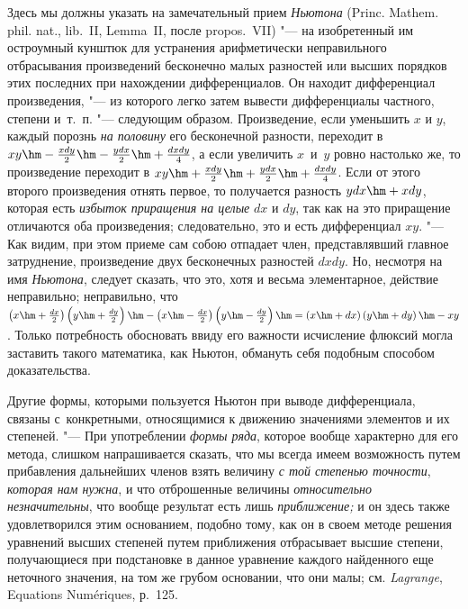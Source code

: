 Здесь мы должны указать на замечательный прием {\em Ньютона} (Princ. Mathem.
phil. nat., lib.~II, Lemma~II, после propos.~VII) "--- на изобретенный им
остроумный кунштюк для устранения арифметически неправильного отбрасывания
произведений бесконечно малых разностей или высших порядков этих последних при
нахождении дифференциалов. Он находит дифференциал произведения, "--- из
которого легко затем вывести дифференциалы частного, степени и~т.~п. "---
следующим образом. Произведение, если уменьшить $x$ и $y$, каждый порознь
{\em на половину} его бесконечной разности, переходит в
$xy\hm-\frac{xdy}2\hm-\frac{ydx}2\hm+\frac{dxdy}4$, а если увеличить
$x$~и~$y$ ровно настолько же, то произведение переходит в
$xy\hm+\frac{xdy}2\hm+\frac{ydx}2\hm+\frac{dxdy}4$. Если от этого второго
произведения отнять первое, то получается разность $ydx\hm+xdy$, которая есть
{\em избыток приращения на целые} $dx$ и $dy$, так как на это приращение
отличаются оба произведения; следовательно, это и есть дифференциал $xy$. "---
Как видим, при этом приеме сам собою отпадает член, представлявший главное
затруднение, произведение двух бесконечных разностей $dxdy$. Но, несмотря на
имя {\em Ньютона}, следует сказать, что это, хотя и весьма элементарное,
действие неправильно; неправильно, что
$\left(x\hm+\frac{dx}2\right)\left(y\hm+\frac{dy}2\right)\hm-
\left(x\hm-\frac{dx}2\right)\left(y\hm-\frac{dy}2\right)\hm=
\left(x\hm+dx\right)\left(y\hm+dy\right)\hm-xy$. Только потребность обосновать
ввиду его важности исчисление флюксий могла заставить такого математика, как
Ньютон, обмануть себя подобным способом доказательства.

Другие формы, которыми пользуется Ньютон при выводе дифференциала, связаны
с~конкретными, относящимися к движению значениями элементов и их степеней. "---
При употреблении {\em формы ряда}, которое вообще характерно для его метода,
слишком напрашивается сказать, что мы всегда имеем возможность путем
прибавления дальнейших членов взять величину {\em с той степенью точности},
{\em которая нам нужна}, и что отброшенные величины {\em относительно
незначительны}, что вообще результат есть лишь {\em приближение;} и он здесь
также удовлетворился этим основанием, подобно тому, как он в своем методе
решения уравнений высших степеней путем приближения отбрасывает высшие
степени, получающиеся при подстановке в данное уравнение каждого найденного
еще неточного значения, на том же грубом основании, что они малы;
см. {\em Lagrange}, Equa\-tions Nu\-méri\-ques, р.~125.

